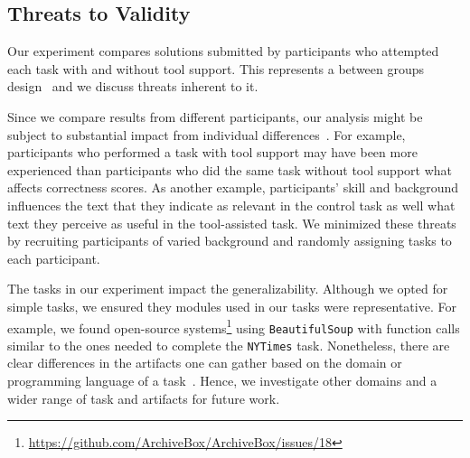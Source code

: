 
\clearpage

\subsection{Threats to Validity}
\label{cp6:threats}







Our experiment compares solutions submitted by participants who attempted each task with and without tool support. 
This represents a between groups design~\cite{Lazar2017-cp3} and we discuss threats inherent to it. 



Since we compare results from different participants, our analysis might be subject to substantial 
impact from individual differences~\cite{Lazar2017-cp3}. 
For example, participants who performed a task with tool support may have been more experienced than participants 
who did the same task without tool support what affects correctness scores.
As another example,  participants' skill and background 
influences the text that they indicate as relevant in the control task as well 
what text they perceive as useful in the tool-assisted task. 
We minimized these threats by recruiting participants of varied background and randomly
assigning tasks to each participant.



The tasks in our experiment impact the generalizability. 
Although we opted for simple tasks, we ensured they 
modules used in our tasks were representative. 
For example, we found open-source systems\footnote{\url{https://github.com/ArchiveBox/ArchiveBox/issues/18}} using \texttt{BeautifulSoup} 
with function calls similar to the ones needed to complete the \texttt{NYTimes} task.
Nonetheless, there are clear differences in the artifacts one can gather 
based on the domain or programming language of a task~\cite{baltes2020}.
Hence, we investigate other domains and a wider range of task 
and artifacts for future work. 



